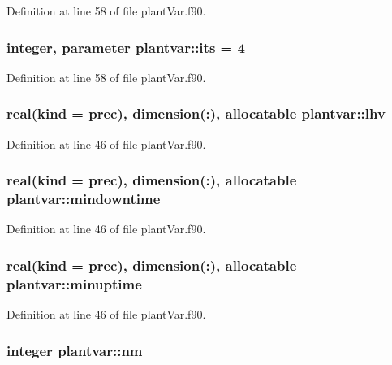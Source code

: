 Definition at line 58 of file plant\-Var.\-f90.

\hypertarget{classplantvar_aaa8d59ae7b5ae7303a9b5bd17499ce56}{
\subsubsection[{its}]{\setlength{\rightskip}{0pt plus 5cm}integer, parameter plantvar\-::its = 4}}\label{classplantvar_aaa8d59ae7b5ae7303a9b5bd17499ce56}


Definition at line 58 of file plant\-Var.\-f90.

\hypertarget{classplantvar_a8c41db489c4d6b494849ab3c82833e29}{
\subsubsection[{lhv}]{\setlength{\rightskip}{0pt plus 5cm}real(kind = prec), dimension(\-:), allocatable plantvar\-::lhv}}\label{classplantvar_a8c41db489c4d6b494849ab3c82833e29}


Definition at line 46 of file plant\-Var.\-f90.

\hypertarget{classplantvar_a9320c1f8ded834439390cb5602c19863}{
\subsubsection[{mindowntime}]{\setlength{\rightskip}{0pt plus 5cm}real(kind = prec), dimension(\-:), allocatable plantvar\-::mindowntime}}\label{classplantvar_a9320c1f8ded834439390cb5602c19863}


Definition at line 46 of file plant\-Var.\-f90.

\hypertarget{classplantvar_aa1e10cfba7b7a224f760c1087d2add6d}{
\subsubsection[{minuptime}]{\setlength{\rightskip}{0pt plus 5cm}real(kind = prec), dimension(\-:), allocatable plantvar\-::minuptime}}\label{classplantvar_aa1e10cfba7b7a224f760c1087d2add6d}


Definition at line 46 of file plant\-Var.\-f90.

\hypertarget{classplantvar_a137041d7f1c30cc7d248b9ada4feab69}{
\subsubsection[{nm}]{\setlength{\rightskip}{0pt plus 5cm}integer plantvar\-::nm}}\label{classplantvar_a137041d7f1c30cc7d248b9ada4feab69}


